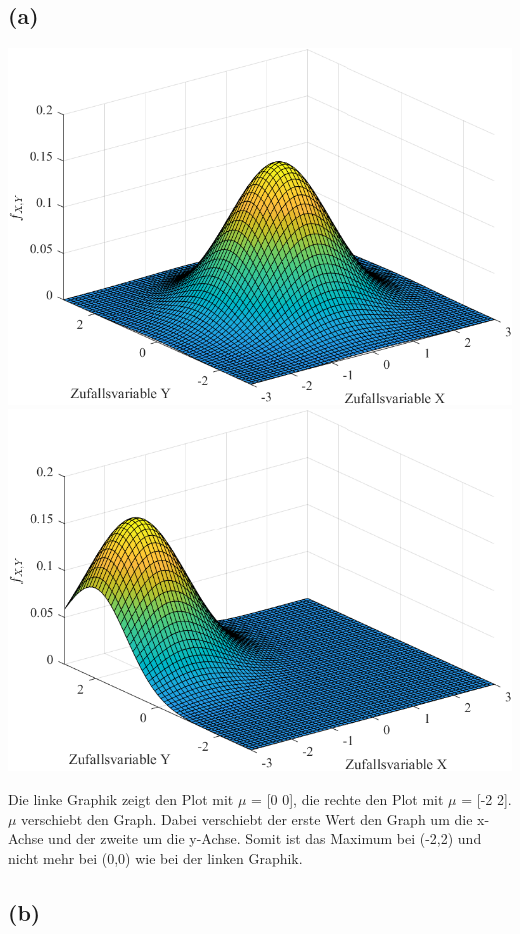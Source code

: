 \documentclass[a4paper]{scrartcl}
\begin{document}
\subsection*{(a)}
\begin{center}
	\includegraphics*[scale = 0.5]{question3a1.png}
	\includegraphics*[scale = 0.5]{question3a2.png}
\end{center}
Die linke Graphik zeigt den Plot mit $\mu$ = [0 0], die rechte den Plot mit $\mu$ = [-2 2].\\
$\mu$ verschiebt den Graph. Dabei verschiebt der erste Wert den Graph um die x-Achse und der zweite um die y-Achse. Somit ist das Maximum bei (-2,2) und nicht mehr bei (0,0) wie bei der linken Graphik.

\subsection*{(b)} %
\end{document}

